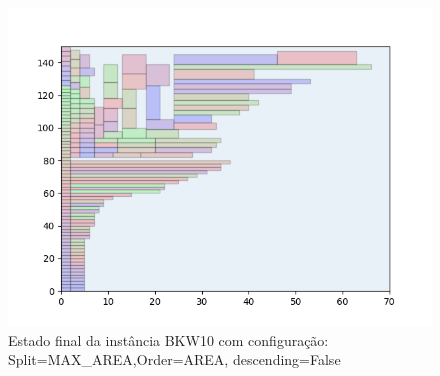 \begin{figure}[H]
    \centering
    \caption[]{Estado final da instância BKW10 com configuração: Split=MAX_AREA,Order=AREA, descending=False}
    \label{fig:bkw10-max_area-area-false}
    \includegraphics[scale=0.5]{output/figures/bkw/bkw10/max_area/area/false/000}
\end{figure}